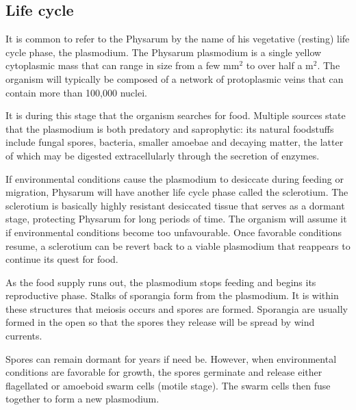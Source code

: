 \subsection{Life cycle}
It is common to refer to the Physarum by the name of his vegetative (resting) life cycle phase, the plasmodium. The Physarum plasmodium is a single yellow cytoplasmic mass that can range in size from a few mm$^2$ to over half a m$^2$. The organism will typically be composed of a network of protoplasmic veins that can contain more than 100,000 nuclei.
\par
It is during this stage that the organism searches for food. Multiple sources state that the plasmodium is both predatory and saprophytic: its natural foodstuffs include fungal spores, bacteria, smaller amoebae and decaying matter, the latter of which may be digested extracellularly through the secretion of enzymes.
\par
If environmental conditions cause the plasmodium to desiccate during feeding or migration, Physarum will have another life cycle phase called the sclerotium. The sclerotium is basically highly resistant desiccated tissue that serves as a dormant stage, protecting Physarum for long periods of time. The organism will assume it if environmental conditions become too
unfavourable. Once favorable conditions resume, a sclerotium can be revert back to a viable plasmodium that reappears to continue its quest for food.
\par
As the food supply runs out, the plasmodium stops feeding and begins its reproductive phase. Stalks of sporangia form from the plasmodium. It is within these structures that meiosis occurs and spores are formed. Sporangia are usually formed in the open so that the spores they release will be spread by wind currents.
\par
Spores can remain dormant for years if need be. However, when environmental conditions are favorable for growth, the spores germinate and release either flagellated or amoeboid swarm cells (motile stage). The swarm cells then fuse together to form a new plasmodium. 

